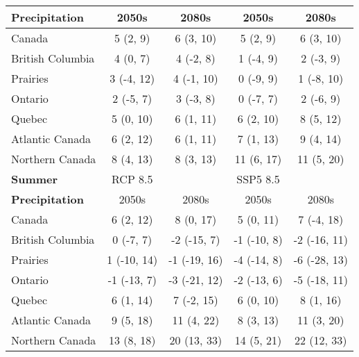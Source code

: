 \documentclass[]{scrartcl}
\begin{document}
\begin{appendices}
\begin{table}[t]
\begin{center}
\begin{tabularx}{\linewidth}{|L|cc|cc|}
			\textbf{Precipitation} & 2050s & 2080s & 2050s &2080s \\
			\hline
			Canada & 5 (2, 9) & 6 (3, 10) & 5 (2, 9) & 6 (3, 10) \\ 
			British Columbia & 4 (0, 7) & 4 (-2, 8) & 1 (-4, 9) & 2 (-3, 9) \\ 
			Prairies & 3 (-4, 12) & 4 (-1, 10) & 0 (-9, 9) & 1 (-8, 10) \\ 
			Ontario & 2 (-5, 7) & 3 (-3, 8) & 0 (-7, 7) & 2 (-6, 9) \\ 
			Quebec & 5 (0, 10) & 6 (1, 11) & 6 (2, 10) & 8 (5, 12) \\ 
			Atlantic Canada & 6 (2, 12) & 6 (1, 11) & 7 (1, 13) & 9 (4, 14) \\ 
			Northern Canada & 8 (4, 13) & 8 (3, 13) & 11 (6, 17) & 11 (5, 20) \\ 		
			\hline
			\textbf{Summer} & RCP 8.5 & & SSP5 8.5 &   \\
			\textbf{Precipitation} & 2050s & 2080s & 2050s &2080s \\
			\hline
			Canada & 6 (2, 12) & 8 (0, 17) & 5 (0, 11) & 7 (-4, 18) \\ 
			British Columbia & 0 (-7, 7) & -2 (-15, 7) & -1 (-10, 8) & -2 (-16, 11) \\ 
			Prairies & 1 (-10, 14) & -1 (-19, 16) & -4 (-14, 8) & -6 (-28, 13) \\ 
			Ontario & -1 (-13, 7) & -3 (-21, 12) & -2 (-13, 6) & -5 (-18, 11) \\ 
			Quebec & 6 (1, 14) & 7 (-2, 15) & 6 (0, 10) & 8 (1, 16) \\ 
			Atlantic Canada & 9 (5, 18) & 11 (4, 22) & 8 (3, 13) & 11 (3, 20) \\ 
			Northern Canada & 13 (8, 18) & 20 (13, 33) & 14 (5, 21) & 22 (12, 33) \\ 	
			\hline	
		\end{tabularx}
	\end{center}
\end{table}


\end{appendices}
\end{document}
